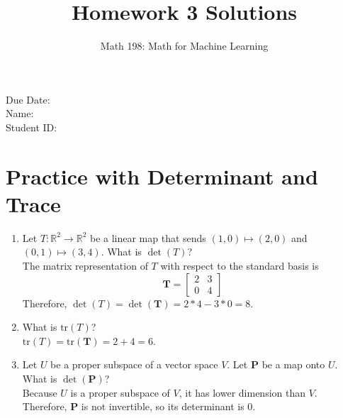 \documentclass{article}
\title{Homework 3 Solutions}
\author{Math 198: Math for Machine Learning}
\date{}
\begin{document}
\maketitle

\noindent
Due Date:  \\
Name: \\
Student ID:

\section{Practice with Determinant and Trace}
\begin{enumerate}
\item Let $T: \mathbb{R}^2 \to \mathbb{R}^2$ be a linear map that sends $(1,0) \mapsto (2,0)$ and $(0,1) \mapsto (3,4)$. What is $\det(T)$? \\
{\color{blue} The matrix representation of $T$ with respect to the standard basis is $$\mathbf{T} = \begin{bmatrix} 2 & 3 \\ 0 & 4 \end{bmatrix}$$ Therefore, $\det(T) = \det(\mathbf{T}) = 2*4 - 3*0 = 8$.}
\item What is $\text{tr}(T)$? \\
{\color{blue} $\text{tr}(T) = \text{tr}(\mathbf{T}) = 2 + 4 = 6$.}
\item Let $U$ be a proper subspace of a vector space $V$. Let $\mathbf{P}$ be a map onto $U$. What is $\det(\mathbf{P})$? \\
{\color{blue} Because $U$ is a proper subspace of $V$, it has lower dimension than $V$. Therefore, $\mathbf{P}$ is not invertible, so its determinant is 0.}
\end{enumerate}
\end{document}
